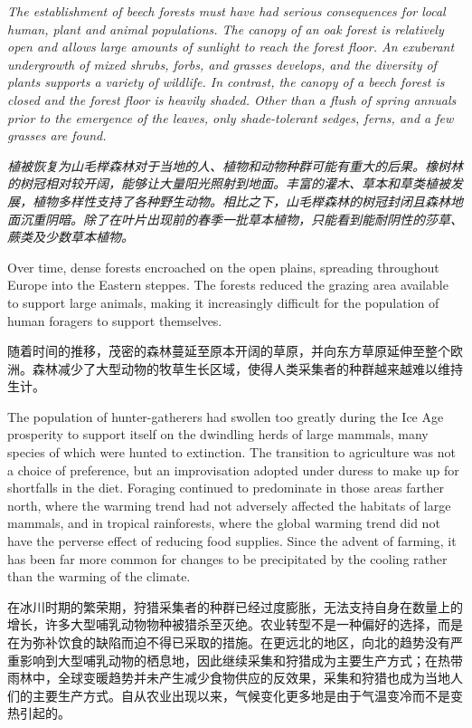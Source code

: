 \begin{Parallel}{97mm}{72mm}
  \ParallelLText
  {\footnotesize{\emph{The establishment of beech forests must have had serious consequences for local human, plant and animal populations. The canopy of an oak forest is relatively open and allows large amounts of sunlight to reach the forest floor. An exuberant undergrowth of mixed shrubs, forbs, and grasses develops, and the diversity of plants supports a variety of wildlife. In contrast, the canopy of a beech forest is closed and the forest floor is heavily shaded. Other than a flush of spring annuals prior to the emergence of the leaves, only shade-tolerant sedges, ferns, and a few grasses are found.}}}
  
  \ParallelRText
  {\footnotesize{\emph{植被恢复为山毛榉森林对于当地的人、植物和动物种群可能有重大的后果。橡树林的树冠相对较开阔，能够让大量阳光照射到地面。丰富的灌木、草本和草类植被发展，植物多样性支持了各种野生动物。相比之下，山毛榉森林的树冠封闭且森林地面沉重阴暗。除了在叶片出现前的春季一批草本植物，只能看到能耐阴性的莎草、蕨类及少数草本植物。}}}
  \ParallelPar



  \ParallelLText
  {Over time, dense forests encroached on the open plains, spreading throughout Europe into the Eastern steppes. The forests reduced the grazing area available to support large animals, making it increasingly difficult for the population of human foragers to support themselves.}
  
  \ParallelRText
  {随着时间的推移，茂密的森林蔓延至原本开阔的草原，并向东方草原延伸至整个欧洲。森林减少了大型动物的牧草生长区域，使得人类采集者的种群越来越难以维持生计。}
  \ParallelPar



  \ParallelLText
  {The population of hunter-gatherers had swollen too greatly during the Ice Age prosperity to support itself on the dwindling herds of large mammals, many species of which were hunted to extinction. The transition to agriculture was not a choice of preference, but an improvisation adopted under duress to make up for shortfalls in the diet. Foraging continued to predominate in those areas farther north, where the warming trend had not adversely affected the habitats of large mammals, and in tropical rainforests, where the global warming trend did not have the perverse effect of reducing food supplies. Since the advent of farming, it has been far more common for changes to be precipitated by the cooling rather than the warming of the climate.}
  
  \ParallelRText
  {在冰川时期的繁荣期，狩猎采集者的种群已经过度膨胀，无法支持自身在数量上的增长，许多大型哺乳动物物种被猎杀至灭绝。农业转型不是一种偏好的选择，而是在为弥补饮食的缺陷而迫不得已采取的措施。在更远北的地区，向北的趋势没有严重影响到大型哺乳动物的栖息地，因此继续采集和狩猎成为主要生产方式；在热带雨林中，全球变暖趋势并未产生减少食物供应的反效果，采集和狩猎也成为当地人们的主要生产方式。自从农业出现以来，气候变化更多地是由于气温变冷而不是变热引起的。}
  \ParallelPar



\end{Parallel}
